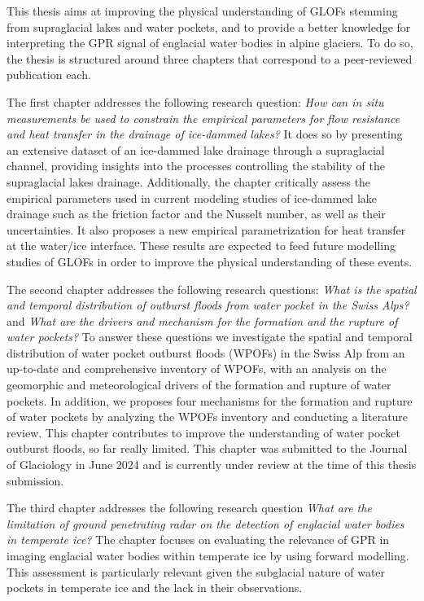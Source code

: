 This thesis aims at improving the physical understanding of GLOFs stemming from supraglacial lakes and water pockets, and to provide a better knowledge for interpreting the GPR signal of englacial water bodies in alpine glaciers. To do so, the thesis is structured around three chapters that correspond to a peer-reviewed publication each.


The first chapter \citep{Ogier&al2021} addresses the following research question: \textit{How can in situ measurements be used to constrain the empirical parameters for flow resistance and heat transfer in the drainage of ice-dammed lakes?} It does so by presenting an extensive dataset of an ice-dammed lake drainage through a supraglacial channel, providing insights into the processes controlling the stability of the supraglacial lakes drainage. Additionally, the chapter critically assess the empirical parameters used in current modeling studies of ice-dammed lake drainage such as the friction factor and the Nusselt number, as well as their uncertainties. It also proposes a new empirical parametrization for heat transfer at the water/ice interface. These results are expected to feed future modelling studies of GLOFs in order to improve the physical understanding of these events.

The second chapter addresses the following research questions: \textit{What is the spatial and temporal distribution of outburst floods from water pocket in the Swiss Alps?} and \textit{What are the drivers and mechanism for the formation and the rupture of water pockets?} To answer these questions we investigate the spatial and temporal distribution of water pocket outburst floods (WPOFs) in the Swiss Alp from an up-to-date and comprehensive inventory of WPOFs, with an analysis on the geomorphic and meteorological drivers of the formation and rupture of water pockets. In addition, we proposes four mechanisms for the formation and rupture of water pockets by analyzing the WPOFs inventory and conducting a literature review. This chapter contributes to improve the understanding of water pocket outburst floods, so far really limited. This chapter was submitted to the Journal of Glaciology in June 2024 and is currently under review at the time of this thesis submission.

The third chapter \citep{Ogier&al2023} addresses the following research question \textit{What are the limitation of ground penetrating radar on the detection of englacial water bodies in temperate ice?} The chapter focuses on evaluating the relevance of GPR in imaging englacial water bodies within temperate ice by using forward modelling. This assessment is particularly relevant given the subglacial nature of water pockets in temperate ice and the lack in their observations.

